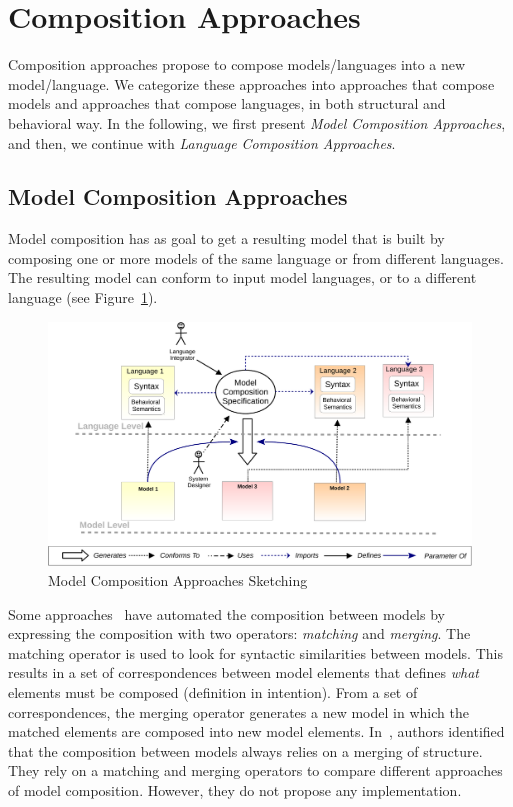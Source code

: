\section{Composition Approaches}
Composition approaches propose to compose models/languages into a new model/language. We categorize these approaches into approaches that compose models and approaches that compose languages, in both structural and behavioral way. In the following, we first present \emph{Model Composition Approaches}, and then, we continue with \emph{Language Composition Approaches}.
 
\subsection{Model Composition Approaches}
Model composition has as goal to get a resulting model that is built by composing one or more models of the same language or from different languages. The resulting model can conform to input model languages, or to a different language (see Figure~\ref{fig:modelcompo}).

\begin{figure}
	\begin{center}
		\includegraphics[width=1\textwidth]{background/figs/modelcompo}
		\caption{Model Composition Approaches Sketching}
		\label{fig:modelcompo}
	\end{center}
\end{figure}

Some approaches~\cite{mergemanifest,epsilon,kompose} have automated the composition between models by expressing the composition with two operators: \emph{matching} and \emph{merging}. The matching operator is used to look for syntactic similarities between models. This results in a set of correspondences between model elements that defines \emph{what} elements must be composed (definition in intention). From a set of correspondences, the merging operator generates a new model in which the matched elements are composed into new model elements. In~\cite{mergemanifest}, authors identified that the composition between models always relies on a merging of structure. They rely on a matching and merging operators to compare different approaches of model composition. However, they do not propose any implementation.

